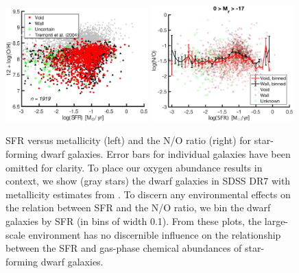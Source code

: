 \begin{figure}
    \centering
    \includegraphics[width=0.49\textwidth]{Images/Paper3/SFR_OH_1sig_I06relations_dwarf+T04_SF_t3_dust}
    \includegraphics[width=0.49\textwidth]{Images/Paper3/SFR_NO_1sig_I06relations_dwarf_SF_t3_dust_scatterSFRbin}
    \caption[SFR versus O/H and N/O for star-forming dwarf galaxies]{SFR versus 
    metallicity (left) and the N/O ratio (right) for star-forming dwarf 
    galaxies.  Error bars for individual galaxies have been omitted for clarity.  
    To place our oxygen abundance results in context, we show (gray stars) the 
    dwarf galaxies in SDSS DR7 with metallicity estimates from 
    \cite{Tremonti04}.  To discern any environmental effects on the relation 
    between SFR and the N/O ratio, we bin the dwarf galaxies by SFR (in bins of 
    width 0.1).  From these plots, the large-scale environment has no 
    discernible influence on the relationship between the SFR and gas-phase 
    chemical abundances of star-forming dwarf galaxies.}
    \label{fig:SFR}
\end{figure}

